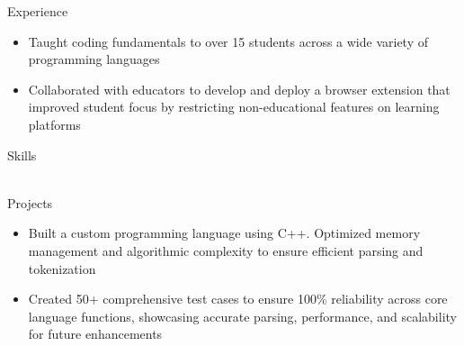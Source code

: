 \documentclass{resume}
\begin{document}
\begin{experienceSection}{Experience}
    \experienceItem[
        company={theCoderSchool},
        location={Berkeley Heights, NJ},
        position={Code Tutor},
        duration={March 2024 - August 2024}
    ]
    \begin{itemize}[itemsep=-6pt, leftmargin=1.2em, rightmargin=0.8em, before=\raggedright, after=\normalfont]
        \item Taught coding fundamentals to over 15 students across a wide variety of programming languages
        \item Collaborated with educators to develop and deploy a browser extension that improved student focus by restricting non-educational features on learning platforms
    \end{itemize}

\end{experienceSection}

\begin{skillsSection}{Skills}
    \skillItem[
        category={Languages},
        skills={Python, C, C++, JavaScript, TypeScript, Java, PHP, SQL}
    ] \\
    \skillItem[
        category={Full-Stack Development},
        skills={React, Next.js, Vue, Node.js, MongoDB, Zustand, Tailwind}
    ] \\
    \skillItem[
        category={DevOps \& Tooling},
        skills={AWS, EKS, ECR, Terraform, ArgoCD, CircleCI, Linux/Unix, Git, Bash}
    ]
\end{skillsSection}

\begin{experienceSection}{Projects}
    \projectItem[
        title={Mini C-Like Programming Language},
    ]
    \vspace{-0.5em}
    \begin{itemize}[topsep=0pt, itemsep=-6pt, leftmargin=1.2em, rightmargin=0.8em, before=\raggedright, after=\normalfont]
        \item Built a custom programming language using C++. Optimized memory management and algorithmic complexity to ensure efficient parsing and tokenization
        \item Created 50+ comprehensive test cases to ensure 100\% reliability across core language functions, showcasing accurate parsing, performance, and scalability for future enhancements
    \end{itemize}
\end{experienceSection}
\end{document}
